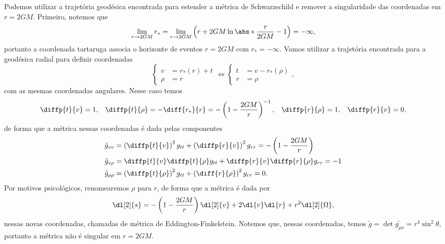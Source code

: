 Podemos utilizar a trajetória geodésica encontrada para estender a métrica de Schwarzschild e remover a singularidade das coordenadas em \(r = 2GM\). Primeiro, notemos que
\begin{equation*}
    \lim_{r \to 2GM} r_* = \lim_{r \to 2GM} \left(r + 2GM \ln\abs*{\frac{r}{2GM} - 1}\right) = - \infty,
\end{equation*}
portanto a coordenada tartaruga associa o horizonte de eventos \(r = 2GM\) com \(r_* = -\infty\). Vamos utilizar a trajetória encontrada para a geodésica radial para definir coordenadas
\begin{equation*}
    \left\{\begin{aligned}
        v &= r_*(r) + t\\
        \rho &= r
    \end{aligned}\right. \iff
    \left\{\begin{aligned}
        t &= v - r_*(\rho)\\
        r &= \rho
    \end{aligned}\right.,
\end{equation*}
com as mesmas coordenadas angulares. Nesse caso temos
\begin{align*}
    \diffp{t}{v} &= 1,&\diffp{t}{\rho} &= -\diff{r_*}{r} = - \left(1 - \frac{2GM}{r}\right)^{-1},&\diffp{r}{\rho} &= 1,&\diffp{r}{v} = 0,
\end{align*}
de forma que a métrica nessas coordenadas é dada pelas componentes
\begin{align*}
    \tilde{g}_{vv} &= \left(\diffp{t}{v}\right)^2g_{tt} + \left(\diffp{r}{v}\right)^2g_{rr} = - \left(1 - \frac{2GM}{r}\right)\\
    \tilde{g}_{v\rho} &= \diffp{t}{v}\diffp{t}{\rho} g_{tt} + \diffp{r}{v} \diffp{r}{\rho} g_{rr} = -1\\
    \tilde{g}_{\rho\rho} &= \left(\diffp{t}{\rho}\right)^2 g_{tt} + \left(\diff{r}{\rho}\right)^2 g_{rr} = 0.
\end{align*}
Por motivos psicológicos, renomearemos \(\rho\) para \(r\), de forma que a métrica é dada por
\begin{equation*}
    \dl[2]{s} = -\left(1 - \frac{2GM}{r}\right)\dl[2]{v} + 2\dl{v}\dl{r} + r^2\dl[2]{\Omega},
\end{equation*}
nessas novas coordenadas, chamadas de métrica de Eddington-Finkelstein. Notemos que, nessas coordenadas, temos \(\tilde{g} = \det{\tilde{g_{\mu\nu}}} = r^4\sin^2\theta\), portanto a métrica não é singular em \(r = 2GM\).

